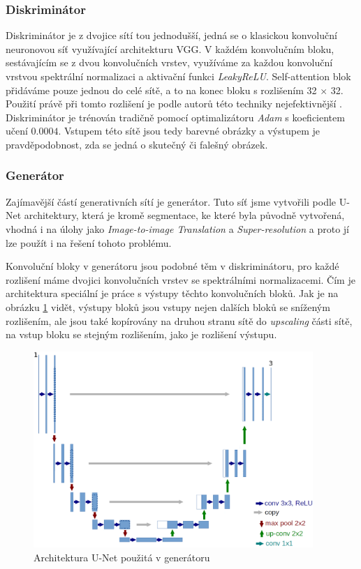 \documentclass[12pt, a4paper]{article}
\begin{document}
    \subsubsection{Diskriminátor}
    Diskriminátor je z dvojice sítí tou jednodušší, jedná se o klasickou konvoluční neuronovou síť využívající architekturu VGG. V každém konvolučním bloku, sestávajícím se z dvou konvolučních vrstev, využíváme za každou konvoluční vrstvou spektrální normalizaci a aktivační funkci \textit{LeakyReLU}. Self-attention blok přidáváme pouze jednou do celé sítě, a to na konec bloku s rozlišením 32 $\times$ 32. Použití právě při tomto rozlišení je podle autorů této techniky nejefektivnější \cite{sagan}. Diskriminátor je trénován tradičně pomocí optimalizátoru \textit{Adam} s koeficientem učení $0.0004$. Vstupem této sítě jsou tedy barevné obrázky a výstupem je pravděpodobnost, zda se jedná o skutečný či falešný obrázek.
    
    \subsubsection{Generátor}
    Zajímavější částí generativních sítí je generátor. Tuto síť jsme vytvořili podle U-Net architektury, která je kromě segmentace, ke které byla původně vytvořená, vhodná i na úlohy jako \textit{Image-to-image Translation} a \textit{Super-resolution} a proto jí lze použít i na řešení tohoto problému. 
    
    Konvoluční bloky v generátoru jsou podobné těm v diskriminátoru, pro každé rozlišení máme dvojici konvolučních vrstev se spektrálními normalizacemi. Čím je architektura speciální je práce s výstupy těchto konvolučních bloků. Jak je na obrázku \ref{unet} vidět, výstupy bloků jsou vstupy nejen dalších bloků se sníženým rozlišením, ale jsou také kopírovány na druhou stranu sítě do \textit{upscaling} části sítě, na vstup bloku se stejným rozlišením, jako je rozlišení výstupu.
    
    \begin{figure}
        \centering
        \includegraphics[width=300pt]{unet.png}
        \caption{Architektura U-Net použitá v generátoru}
        \label{unet}
    \end{figure}
    
\end{document}
